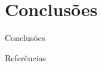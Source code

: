 \documentclass{beamer}
\begin{document}
\section{Conclusões}
\begin{frame}{Conclusões}
\end{frame}


\begin{frame}{Referências}


\end{frame}

\begin{frame}
\maketitle
\end{frame}
\end{document}
